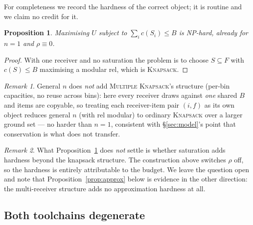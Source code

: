 \documentclass[sigconf,anonymous]{aamas}
\newtheorem{proposition}{Proposition}
\theoremstyle{remark}
\newtheorem{remark}{Remark}
\begin{document}
For completeness we record the hardness of the correct object; it is
routine and we claim no credit for it.

\begin{proposition}
\label{prop:hard}
Maximising $U$ subject to $\sum_i c(S_i) \le B$ is NP-hard, already for
$n=1$ and $\rho \equiv 0$.
\end{proposition}

\begin{proof}
With one receiver and no saturation the problem is to choose
$S \subseteq F$ with $c(S) \le B$ maximising a modular $\mathrm{rel}$,
which is \textsc{Knapsack}.
\end{proof}

\begin{remark}
General $n$ does \emph{not} add \textsc{Multiple Knapsack}'s structure
(per-bin capacities, no reuse across bins): here every receiver draws
against \emph{one} shared $B$ and items are copyable, so treating each
receiver-item pair $(i,f)$ as its own object reduces general $n$ (with
$\mathrm{rel}$ modular) to ordinary \textsc{Knapsack} over a larger
ground set --- no harder than $n=1$, consistent with
\S\ref{sec:model}'s point that conservation is what does not transfer.
\end{remark}

\begin{remark}
What Proposition~\ref{prop:hard} does \emph{not} settle is whether
saturation adds hardness beyond the knapsack structure. The
construction above switches $\rho$ off, so the hardness is entirely
attributable to the budget. We leave the question open and note that
Proposition~\ref{prop:approx} below is evidence in the other
direction: the multi-receiver structure adds no approximation hardness
at all.
\end{remark}

\subsection{Both toolchains degenerate}
\label{sec:degen}
\end{document}
